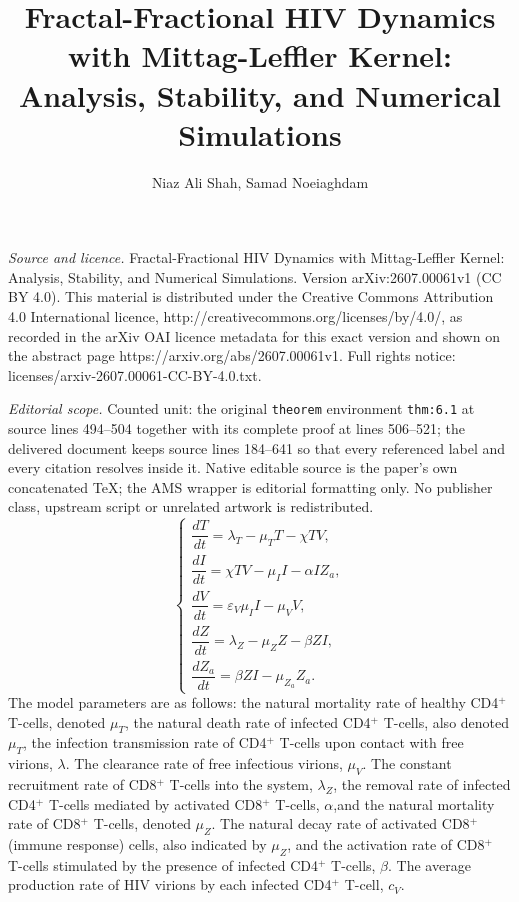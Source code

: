 \documentclass[10pt,a4paper]{amsart}
\numberwithin{equation}{section}
\begin{document}
\title[Fractal-Fractional HIV Dynamics with Mittag-Leffler Kernel: ]{Fractal-Fractional HIV Dynamics with Mittag-Leffler Kernel: Analysis, Stability, and Numerical Simulations}
\author{Niaz Ali Shah, Samad Noeiaghdam}
\date{}
\maketitle
\noindent\emph{Source and licence.} Fractal-Fractional HIV Dynamics with Mittag-Leffler Kernel: Analysis, Stability, and Numerical Simulations. Version arXiv:2607.00061v1 (CC BY 4.0). This material is distributed under the Creative Commons Attribution 4.0 International licence, http://creativecommons.org/licenses/by/4.0/, as recorded in the arXiv OAI licence metadata for this exact version and shown on the abstract page https://arxiv.org/abs/2607.00061v1. Full rights notice: licenses/arxiv-2607.00061-CC-BY-4.0.txt.\par\smallskip
\noindent\textit{Editorial scope.} Counted unit: the original \texttt{theorem} environment \texttt{thm:6.1} at source lines 494--504 together with its complete proof at lines 506--521; the delivered document keeps source lines 184--641 so that every referenced label and every citation resolves inside it. Native editable source is the paper's own concatenated TeX; the AMS wrapper is editorial formatting only. No publisher class, upstream script or unrelated artwork is redistributed.
\begin{equation} \label{2-1}
\begin{cases}
\dfrac{dT}{dt} = \lambda_T - \mu_T T - \chi T V, \\[6pt]
\dfrac{dI}{dt} = \chi T V - \mu_I I - \alpha I Z_a, \\[6pt]
\dfrac{dV}{dt} = \varepsilon_V \mu_I I - \mu_V V, \\[6pt]
\dfrac{dZ}{dt} = \lambda_Z - \mu_Z Z - \beta Z I, \\[6pt]
\dfrac{dZ_a}{dt} = \beta Z I - \mu_{Z_a} Z_a .
\end{cases}
\end{equation}
The model parameters are as follows: the natural mortality rate of healthy CD4\(^+\) T-cells, denoted \(\mu_T\), the natural death rate of infected CD4\(^+\) T-cells, also denoted \(\mu_T\), the infection transmission rate of CD4\(^+\) T-cells upon contact with free virions, \(\lambda\). The clearance rate of free infectious virions, \(\mu_V\). The constant recruitment rate of CD8\(^+\) T-cells into the system, \(\lambda_Z\), the removal rate of infected CD4\(^+\) T-cells mediated by activated CD8\(^+\) T-cells, \(\alpha\),and the natural mortality rate of CD8\(^+\) T-cells, denoted \(\mu_Z\). The natural decay rate of activated CD8\(^+\) (immune response) cells, also indicated by \(\mu_Z\), and the activation rate of CD8\(^+\) T-cells stimulated by the presence of infected CD4\(^+\) T-cells, \(\beta\). The average production rate of HIV virions by each infected CD4\(^+\) T-cell, \(c_V\).
\end{document}
